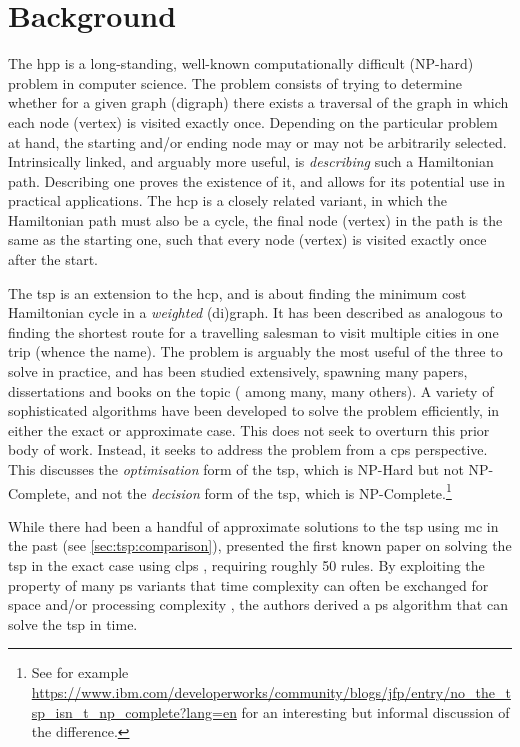 \section{Background}

The \gls{hpp} is a long-standing, well-known computationally difficult (NP-hard) problem in computer science.  The problem consists of trying to determine whether for a given graph (digraph) there exists a traversal of the graph in which each node (vertex) is visited exactly once.  Depending on the particular problem at hand, the starting and/or ending node may or may not be arbitrarily selected.  Intrinsically linked, and arguably more useful, is \emph{describing} such a Hamiltonian path.  Describing one proves the existence of it, and allows for its potential use in practical applications.  The \gls{hcp} is a closely related variant, in which the Hamiltonian path must also be a cycle, \ie{} the final node (vertex) in the path is the same as the starting one, such that every node (vertex) is visited exactly once after the start.

The \gls{tsp} is an extension to the \gls{hcp}, and is about finding the minimum cost Hamiltonian cycle in a \emph{weighted} (di)graph.  It has been described as analogous to finding the shortest route for a travelling salesman to visit multiple cities in one trip (whence the name).  The problem is arguably the most useful of the three to solve in practice, and has been studied extensively, spawning many papers, dissertations and books on the topic (\eg{} \cite{Smith2017,Ezugwu2017,Cook2012,Applegate2006} among many, many others).  A variety of sophisticated algorithms have been developed to solve the problem efficiently, in either the exact or approximate case.  This  does not seek to overturn this prior body of work.  Instead, it seeks to address the problem from a \gls{cps} perspective.  This  discusses the \emph{optimisation} form of the \gls{tsp}, which is NP-Hard but not NP-Complete, and not the \emph{decision} form of the \gls{tsp}, which is NP-Complete.\footnote{See for example \url{https://www.ibm.com/developerworks/community/blogs/jfp/entry/no_the_tsp_isn_t_np_complete?lang=en} for an interesting but informal discussion of the difference.}

While there had been a handful of approximate solutions to the \gls{tsp} using \gls{mc} in the past (see \vref{sec:tsp:comparison}), \citeauthor{Guo2017} presented the first known paper on solving the \gls{tsp} in the exact case using \gls{clps} \cite{Guo2017}, requiring roughly 50 rules.  By exploiting the property of many \gls{ps} variants that time complexity can often be exchanged for space and/or processing complexity \cite{Paun1999,Paun2002a,Jimenez2003,Song2017}, the authors derived a \gls{ps} algorithm that can solve the \gls{tsp} in  time.

